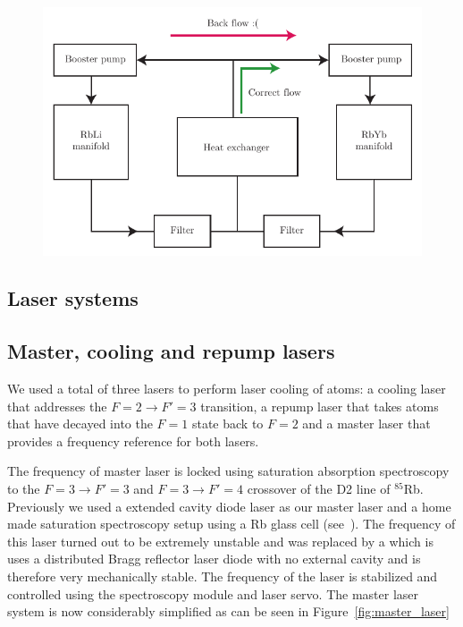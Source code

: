 \begin{figure}[htb]
\begin{center}
\includegraphics[]{Figures/Chapter4/water_cooling.pdf}
\caption[Water cooling manifold schematic]{}
\label{fig:water_cooling}
\end{center}
\end{figure}

\subsection{Laser systems}

\subsection{Master, cooling and repump lasers}

We used a total of three lasers to perform laser cooling of atoms: a cooling laser that addresses the $F=2\rightarrow F'=3$ transition, a repump laser that takes atoms that have decayed into the $F=1$ state back to $F=2$ and a master laser that provides a frequency reference for both lasers. 

The frequency of master laser is locked using saturation absorption spectroscopy to the $F=3\rightarrow F'=3$ and $F=3\rightarrow F'=4$ crossover of the D2 line of $^{85}$Rb. Previously we used a  extended cavity diode laser as our master laser and a home made saturation spectroscopy setup using a Rb glass cell (see~\cite{CampbellThesis,PriceThesis}). The frequency of this laser turned out to be extremely unstable and was replaced by a  which is uses a distributed Bragg reflector laser diode with no external cavity and is therefore very mechanically stable. The frequency of the laser is stabilized and controlled using the  spectroscopy module and  laser servo. The master laser system is now considerably simplified as can be seen in Figure~\ref{fig:master_laser}

